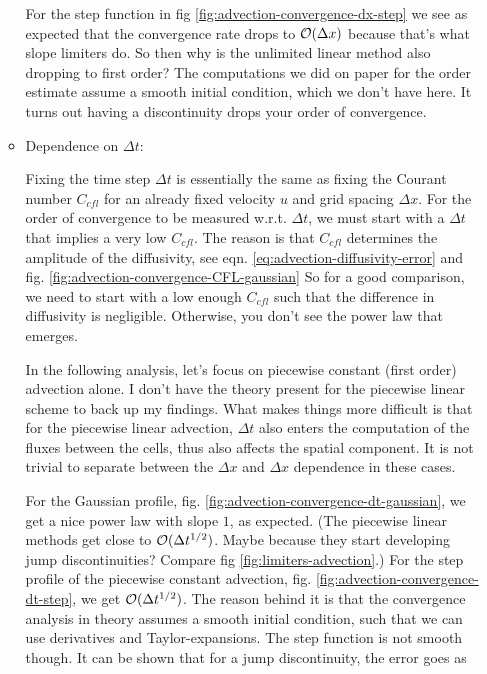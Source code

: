 \begin{itemize}
\begin{itemize}
				
				For the step function in fig \ref{fig:advection-convergence-dx-step} we see as expected that the convergence rate drops to $\mathcal{O}(\Delta x)$ because that's what slope limiters do.
				So then why is the unlimited linear method also dropping to first order?
				The computations we did on paper for the order estimate assume a smooth initial condition, which we don't have here. 
				It turns out having a discontinuity drops your order of convergence.
				
			
			
			\item Dependence on $\Delta t$:
			
				Fixing the time step $\Delta t$ is essentially the same as fixing the Courant number $C_{cfl}$ for an already fixed velocity $u$ and grid spacing $\Delta x$.
				For the order of convergence to be measured w.r.t. $\Delta t$, we must start with a $\Delta t$ that implies a very low $C_{cfl}$.
				The reason is that $C_{cfl}$ determines the amplitude of the diffusivity, see eqn. \ref{eq:advection-diffusivity-error} and fig. \ref{fig:advection-convergence-CFL-gaussian}
				So for a good comparison, we need to start with a low enough $C_{cfl}$ such that the difference in diffusivity is negligible.
				Otherwise, you don't see the power law that emerges.
				
				In the following analysis, let's focus on piecewise constant (first order) advection alone.
				I don't have the theory present for the piecewise linear scheme to back up my findings. 
				What makes things more difficult is that for the piecewise linear advection, $\Delta t$ also enters the computation of the fluxes between the cells, thus also affects the spatial component. 
				It is not trivial to separate between the $\Delta x$ and $\Delta x$ dependence in these cases.
				
				For the Gaussian profile, fig. \ref{fig:advection-convergence-dt-gaussian}, we get a nice power law with slope $1$, as expected.
				(The piecewise linear methods get close to $\mathcal{O}(\Delta t ^ {1/2})$. 
				Maybe because they start developing jump discontinuities?
				Compare fig \ref{fig:limiters-advection}.)
				For the step profile of the piecewise constant advection, fig. \ref{fig:advection-convergence-dt-step}, we get $\mathcal{O}(\Delta t ^ {1/2})$.
				The reason behind it is that the convergence analysis in theory assumes a smooth initial condition, such that we can use derivatives and Taylor-expansions.
				The step function is not smooth though.
				It can be shown that for a jump discontinuity, the error goes as
				

\end{itemize}
\end{itemize}
